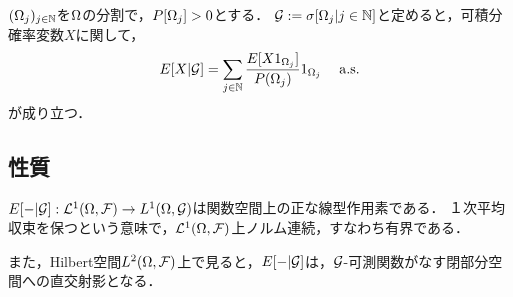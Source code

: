 \documentclass[uplatex,dvipdfmx]{jsreport}
\begin{document}
\begin{example}[条件付き確率]
    $(\Omega_j)_{j\in\mathbb{N}}$を$\Omega$の分割で，$P[\Omega_j]>0$とする．
    $\mathcal{G}:=\sigma[\Omega_j|j\in\mathbb{N}]$と定めると，可積分確率変数$X$に関して，
    \[E[X|\mathcal{G}]=\sum_{j\in\mathbb{N}}\frac{E[X1_{\Omega_j}]}{P(\Omega_j)}1_{\Omega_j}\quad\;\mathrm{a.s.}\]
    が成り立つ．
\end{example}

\subsection{性質}

\begin{tcolorbox}[colframe=ForestGreen, colback=ForestGreen!10!white,breakable,colbacktitle=ForestGreen!40!white,coltitle=black,fonttitle=\bfseries\sffamily,
title=]
    $E[-|\mathcal{G}]:\mathcal{L}^1(\Omega,\mathcal{F})\to L^1(\Omega,\mathcal{G})$は関数空間上の正な線型作用素である．
    １次平均収束を保つという意味で，$\mathcal{L}^1(\Omega,\mathcal{F})$上ノルム連続，すなわち有界である．

    また，Hilbert空間$L^2(\Omega,\mathcal{F})$上で見ると，$E[-|\mathcal{G}]$は，$\mathcal{G}$-可測関数がなす閉部分空間への直交射影となる．
\end{tcolorbox}
\end{document}
